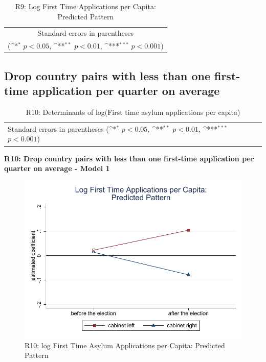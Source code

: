 \documentclass[10pt,a4paper]{scrartcl}
\begin{document}
\begin{table}[!ht]\centering
	\footnotesize
	\renewcommand{\arraystretch}{1.2}
	\def\sym#1{\ifmmode^{#1}\else\(^{#1}\)\fi}
	\caption{R9: Log First Time Applications per Capita: Predicted Pattern}
	\begin{tabular}{l*{2}{c}}
		\hline\hline
		
		\hline\hline
		\multicolumn{3}{c}{\footnotesize Standard errors in parentheses} \\
		\multicolumn{3}{c}{\footnotesize (\sym{*} \(p<0.05\), \sym{**} \(p<0.01\), \sym{***} \(p<0.001\))} \\
	\end{tabular}
\end{table}





\clearpage
\FloatBarrier
\subsection{Drop country pairs with less than one first-time application per quarter on average}
\begin{table}[!ht]\centering
	\renewcommand{\arraystretch}{1.25}
	\small
	\def\sym#1{\ifmmode^{#1}\else\(^{#1}\)\fi}
	\caption{R10: Determinants of log(First time asylum applications per capita)}
	\begin{tabular}{l*{3}{c}}
		\hline\hline
		
		\hline\hline
		\multicolumn{4}{l}{\footnotesize Standard errors in parentheses (\sym{*} \(p<0.05\), \sym{**} \(p<0.01\), \sym{***} \(p<0.001\))}\\
	\end{tabular}
\end{table}

\clearpage
\textbf{R10: Drop country pairs with less than one first-time application per quarter on average - Model 1}
\begin{figure}[!ht]
	\centering
	\includegraphics[width=1\textwidth]{figures_edited/app_graph1_R10.pdf}
	\caption{R10: log First Time Asylum Applications per Capita: Predicted Pattern}
\end{figure}
\end{document}
